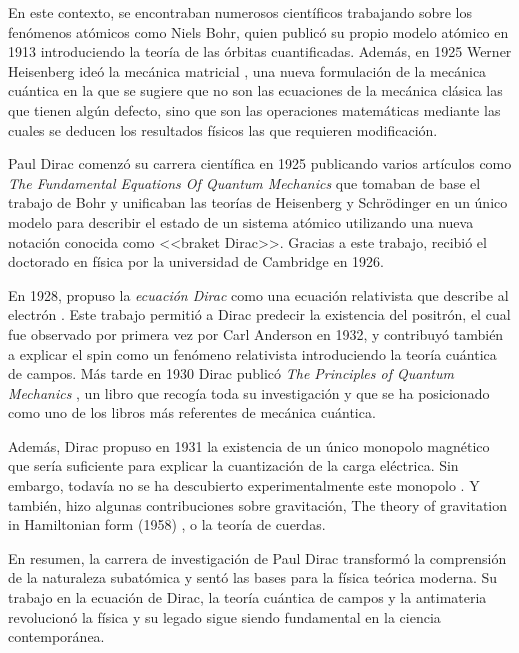 En este contexto, se encontraban numerosos científicos trabajando sobre los fenómenos atómicos como Niels Bohr, quien publicó su propio modelo atómico \cite{RefWorks:bohr1913i} en 1913 introduciendo la teoría de las órbitas cuantificadas. Además, en 1925 Werner Heisenberg ideó la mecánica matricial \cite{RefWorks:heisenberg1925quantum-theoretical}, una nueva formulación de la mecánica cuántica en la que se sugiere que no son las ecuaciones de la mecánica clásica las que tienen algún defecto, sino que son las operaciones matemáticas mediante las cuales se deducen los resultados físicos las que requieren modificación.

Paul Dirac comenzó su carrera científica en 1925 publicando varios artículos como \textit{The Fundamental Equations Of Quantum Mechanics} \cite{RefWorks:dirac1925fundamental} que tomaban de base el trabajo de Bohr y unificaban las teorías de Heisenberg y Schrödinger en un único modelo para describir el estado de un sistema atómico utilizando una nueva notación conocida como <<braket Dirac>>. Gracias a este trabajo, recibió el doctorado en física por la universidad de Cambridge en 1926.

En 1928, propuso la \textit{ecuación Dirac} como una ecuación relativista que describe al electrón \cite{RefWorks:dirac1928quantum}. Este trabajo permitió a Dirac predecir la existencia del positrón, el cual fue observado por primera vez por Carl Anderson en 1932, y contribuyó también a explicar el spin como un fenómeno relativista introduciendo la teoría cuántica de campos. Más tarde en 1930 Dirac publicó \textit{The Principles of Quantum Mechanics} \cite{RefWorks:dirac1958principles}, un libro que recogía toda su investigación y que se ha posicionado como uno de los libros más referentes de mecánica cuántica.

Además, Dirac propuso en 1931 la existencia de un único monopolo magnético que sería suficiente para explicar la cuantización de la carga eléctrica. Sin embargo, todavía no se ha descubierto experimentalmente este monopolo \cite{RefWorks:dirac1931quantised}. Y también, hizo algunas contribuciones sobre gravitación, The theory of gravitation in Hamiltonian form (1958) \cite{dirac1958theory}, o la teoría de cuerdas.

En resumen, la carrera de investigación de Paul Dirac transformó la comprensión de la naturaleza subatómica y sentó las bases para la física teórica moderna. Su trabajo en la ecuación de Dirac, la teoría cuántica de campos y la antimateria revolucionó la física y su legado sigue siendo fundamental en la ciencia contemporánea.

\newpage
\printbibliography
